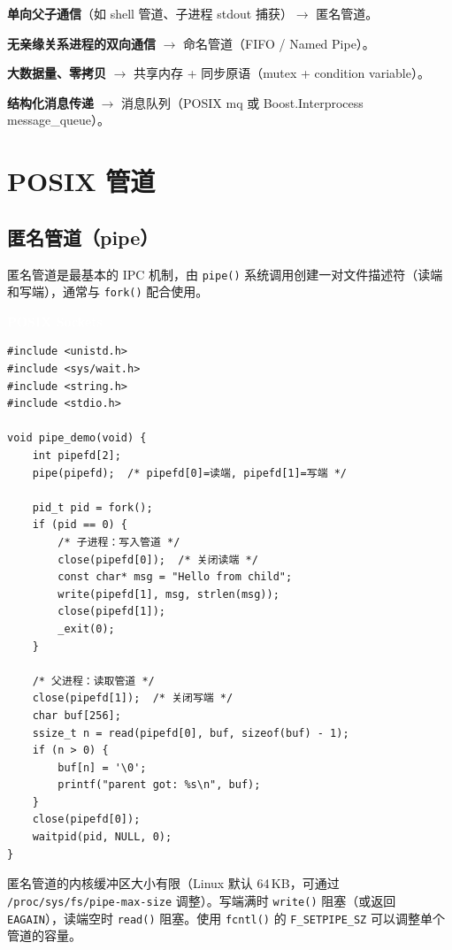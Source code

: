 \documentclass[12pt,a4paper,fontset=fandol]{ctexbook}
\newcommand{\Tp}[1]{\texttt{#1}}
\newcommand{\posixlabel}{%
  \noindent\begin{tcolorbox}[sharp corners,colback=posixheadbg,colframe=posixheadbg,
    left=6pt,right=6pt,top=2pt,bottom=2pt,boxrule=0pt]
  \textcolor{white}{\small\bfseries\sffamily POSIX Sockets}\end{tcolorbox}%
}
\begin{document}
\begin{guideline}[title=选型建议]
\textbf{单向父子通信}（如 shell 管道、子进程 stdout 捕获）$\to$ 匿名管道。

\textbf{无亲缘关系进程的双向通信} $\to$ 命名管道（FIFO / Named Pipe）。

\textbf{大数据量、零拷贝} $\to$ 共享内存 + 同步原语（mutex + condition variable）。

\textbf{结构化消息传递} $\to$ 消息队列（POSIX mq 或 Boost.Interprocess message\_queue）。
\end{guideline}

\section{POSIX 管道}

\subsection{匿名管道（pipe）}

匿名管道是最基本的 IPC 机制，由 \Tp{pipe()} 系统调用创建一对文件描述符（读端和写端），通常与 \Tp{fork()} 配合使用。

\posixlabel
\begin{lstlisting}[style=cstyle]
#include <unistd.h>
#include <sys/wait.h>
#include <string.h>
#include <stdio.h>

void pipe_demo(void) {
    int pipefd[2];
    pipe(pipefd);  /* pipefd[0]=读端, pipefd[1]=写端 */

    pid_t pid = fork();
    if (pid == 0) {
        /* 子进程：写入管道 */
        close(pipefd[0]);  /* 关闭读端 */
        const char* msg = "Hello from child";
        write(pipefd[1], msg, strlen(msg));
        close(pipefd[1]);
        _exit(0);
    }

    /* 父进程：读取管道 */
    close(pipefd[1]);  /* 关闭写端 */
    char buf[256];
    ssize_t n = read(pipefd[0], buf, sizeof(buf) - 1);
    if (n > 0) {
        buf[n] = '\0';
        printf("parent got: %s\n", buf);
    }
    close(pipefd[0]);
    waitpid(pid, NULL, 0);
}
\end{lstlisting}

\begin{note}[title=管道容量]
匿名管道的内核缓冲区大小有限（Linux 默认 64\,KB，可通过 \Tp{/proc/\allowbreak{}\allowbreak{}sys/\allowbreak{}\allowbreak{}fs/\allowbreak{}\allowbreak{}pipe-\allowbreak{}max-\allowbreak{}size} 调整）。写端满时 \Tp{write()} 阻塞（或返回 \Tp{EAGAIN}），读端空时 \Tp{read()} 阻塞。使用 \Tp{fcntl()} 的 \Tp{F\_\allowbreak{}SETPIPE\_\allowbreak{}SZ} 可以调整单个管道的容量。
\end{note}
\end{document}
